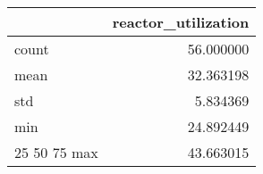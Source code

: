 \begin{tabular}{lr}
\toprule
 & reactor\_utilization \\
\midrule
count & 56.000000 \\
mean & 32.363198 \\
std & 5.834369 \\
min & 24.892449 \\
25%
50%
75%
max & 43.663015 \\
\bottomrule
\end{tabular}

